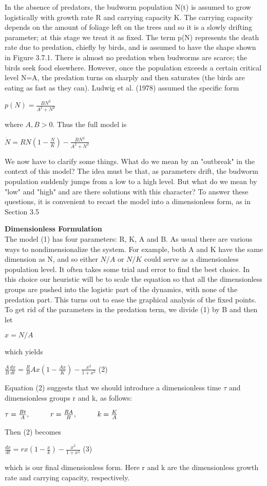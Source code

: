 \documentclass{article}
\newcommand\tab[1][1cm]{\hspace*{#1}}
\begin{document}
In the absence of predators, the budworm population N(t) is assumed to grow logistically with growth rate R and carrying capacity K. The carrying capacity depends on the amount of foliage left on the trees and so it is a slowly drifting parameter; at this stage we treat it as fixed. The term p(N) represents the death rate due to predation, chiefly by birds, and is assumed to have the shape shown in Figure 3.7.1. There is almost no predation when budworms are scarce; the birds seek food elsewhere. However, once the population exceeds a certain critical level N=A, the predation turns on sharply and then saturates (the birds are eating as fast as they can). Ludwig et al. (1978) assumed the specific form
\begin{center}
$p(N)= \frac{BN^{2}}{A^{2}+N^{2}}$
\end{center}
where $A, B > 0$. Thus the full model is
\begin{center}
$\dot{N}=RN(1-\frac{N}{K})- \frac{BN^{2}}{A^{2}+N^{2}}$
\end{center}
We now have to clarify some things. What do we mean by an "outbreak" in the context of this model? The idea must be that, as parameters drift, the budworm population suddenly jumps from a low to a high level. But what do we mean by "low" and "high" and are there solutions with this character? To answer these questions, it is convenient to recast the model into a dimensionless form, as in Section 3.5

\textbf {Dimensionless Formulation} \\ \tab
The model (1) has four parameters: R, K, A and B. As usual there are various ways to nondimensionalize the system. For example, both A and K have the same dimension as N, and so either $N/A$ or $N/K$ could serve as a dimensionless population level. It often takes some trial and error to find the best choice. In this choice our heuristic will be to scale the equation so that all the dimensionless groups are pushed into the logistic part of the dynamics, with none of the predation part. This turns out to ease the graphical analysis of the fixed points. \\ \tab 
To get rid of the parameters in the predation term, we divide (1) by B and then let 
\begin{center}
$x=N/A$
\end{center}
which yields
\begin{center}
$\frac{A}{B}\frac{dx}{dt}=\frac{R}{B} Ax(1-\frac{Ax}{K})-\frac{x^{2}}{1+x^{2}}$ \tab (2)
\end{center}
Equation (2) suggests that we should introduce a dimensionless time $\tau$ and dimensionless groups r and k, as follows:
\begin{center}
$\tau = \frac{Bt}{A}, \tab r=\frac{RA}{B}, \tab k=\frac{K}{A}$
\end{center}
Then (2) becomes
\begin{center}
$\frac{dx}{dt}=rx(1-\frac{x}{k})-\frac{x^{2}}{1+x^{2}}$ \tab (3)
\end{center}
which is our final dimensionless form. Here r and k are the dimensionless growth rate and carrying capacity, respectively.
\end{document}
